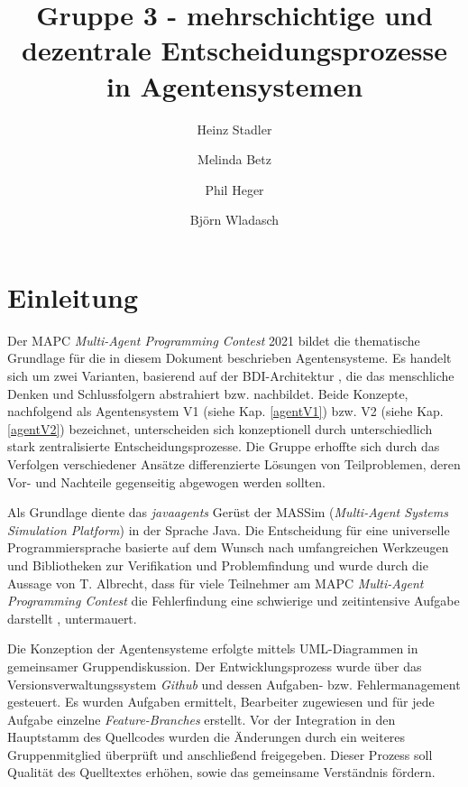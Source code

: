 \documentclass[runningheads]{llncs}
\begin{document}
%
\title{Gruppe 3 - mehrschichtige und dezentrale Entscheidungsprozesse in Agentensystemen}
%
%
\author{Heinz Stadler\and
Melinda Betz\and
Phil Heger\and
Björn Wladasch}
%
%
%
\maketitle              %
%
%
\section{Einleitung}
Der MAPC \textit{Multi-Agent Programming Contest} 2021\cite{MAPC2021} bildet die thematische Grundlage für die in diesem Dokument beschrieben Agentensysteme. Es handelt sich um zwei Varianten, basierend auf der BDI-Architektur \cite{Bratman1987}, die das menschliche Denken und Schlussfolgern abstrahiert bzw. nachbildet. Beide Konzepte, nachfolgend als Agentensystem V1 (siehe Kap. \ref{agentV1}) bzw. V2 (siehe Kap. \ref{agentV2}) bezeichnet, unterscheiden sich konzeptionell durch unterschiedlich stark zentralisierte Entscheidungsprozesse.
Die Gruppe erhoffte sich durch das Verfolgen verschiedener Ansätze differenzierte Lösungen von Teilproblemen, deren Vor- und Nachteile gegenseitig abgewogen werden sollten.


Als Grundlage diente das \textit{javaagents} Gerüst der MASSim (\textit{Multi-Agent Systems Simulation Platform}) \cite{EISMASSim} in der Sprache Java. Die Entscheidung für eine universelle Programmiersprache basierte auf dem Wunsch nach umfangreichen Werkzeugen und Bibliotheken zur Verifikation und Problemfindung und wurde durch die Aussage von T. Albrecht, dass für viele Teilnehmer am MAPC \textit{Multi-Agent Programming Contest} die Fehlerfindung eine schwierige und zeitintensive Aufgabe darstellt \cite[S. 17]{Ahlbrecht2021}, untermauert.

Die Konzeption der Agentensysteme erfolgte mittels UML-Diagrammen in gemeinsamer Gruppendiskussion.
Der Entwicklungsprozess wurde über das Versionsverwaltungssystem \textit{Github} und dessen Aufgaben- bzw. Fehlermanagement gesteuert. Es wurden Aufgaben ermittelt, Bearbeiter zugewiesen und für jede Aufgabe einzelne \textit{Feature-Branches} erstellt. Vor der Integration in den Hauptstamm des Quellcodes wurden die Änderungen durch ein weiteres Gruppenmitglied überprüft und anschließend freigegeben. Dieser Prozess soll Qualität des Quelltextes erhöhen, sowie das gemeinsame Verständnis fördern.
\end{document}

